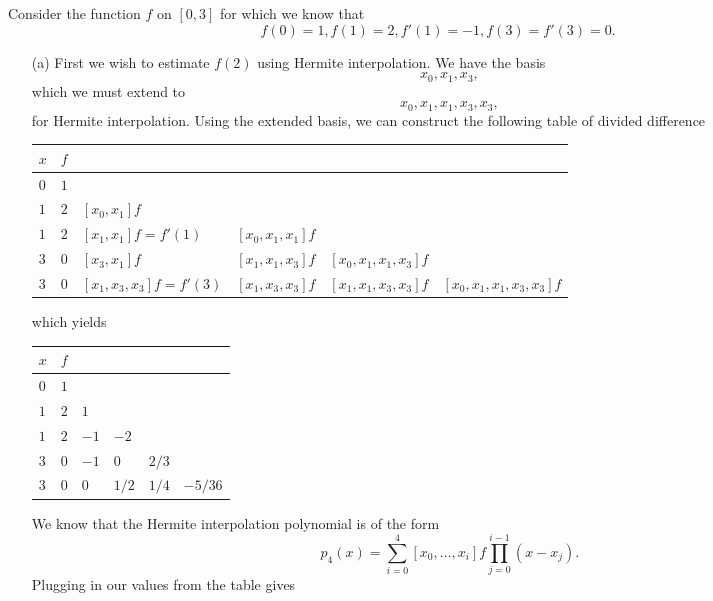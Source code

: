 \documentclass[12pt]{report}
\begin{document}
\begin{solution}

    \noindent
    Consider the function $f$ on $[0,3]$ for which we know that
    \[ 
        f(0) = 1, f(1) = 2, f'(1) = -1, f(3) = f'(3) = 0.
    \]
    \begin{enumerate}
        \item [(a)]
        First we wish to estimate $f(2)$ using Hermite interpolation. We have the basis
        \[ 
            x_0, x_1,x_3,
        \]
        which we must extend to 
        \[ 
            x_0, x_1, x_1, x_3, x_3,
        \]
        for Hermite interpolation. Using the extended basis, we can construct the following table of divided difference
        \begin{center}
            \begin{tabular}{llllll}
                $x$&  $f$&  &  &   \\
                \hline
                $0$&  $1$&  &  &   \\
                $1$&  $2$&  $[x_0,x_1]f$&  &   \\
                $1$&  $2$&  $[x_1,x_1]f = f'(1)$& $[x_0,x_1,x_1]f$ &   \\
                $3$&  $0$&  $[x_3,x_1]f$&  $[x_1,x_1,x_3]f$&  $[x_0,x_1,x_1,x_3]f$\\
                $3$&  $0$&  $[x_1, x_3, x_3]f = f'(3)$& $[x_1,x_3,x_3]f$& $[x_1,x_1,x_3,x_3]f$&$[x_0,x_1,x_1,x_3,x_3]f$
            \end{tabular}    
        \end{center}
        which yields
        \begin{center}
            \begin{tabular}{llllll}
                $x$&  $f$&  &  &   \\
                \hline
                $0$&  $1$&  &  &   \\
                $1$&  $2$&  $1$&  &   \\
                $1$&  $2$&  $-1$& $-2$ &   \\
                $3$&  $0$&  $-1$&  $0$&  $2/3$\\
                $3$&  $0$&  $0$& $1/2$& $1/4$&$-5/36$
            \end{tabular}    
        \end{center}
        We know that the Hermite interpolation polynomial is of the form
        \[ 
            p_4(x) = \sum_{i=0}^4 [x_0,\dots,x_i]f \prod_{j=0}^{i-1}(x - x_j).
        \]
        Plugging in our values from the table gives

\end{enumerate}
\end{solution}
\end{document}
